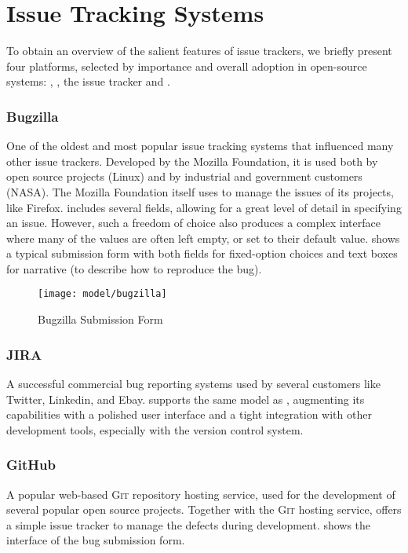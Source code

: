 
\section{Issue Tracking Systems}\label{sec:bugtrackers}

To obtain an overview of the salient features of issue trackers, we briefly present four platforms, selected by importance and overall adoption in open-source systems: \bzilla, \jira, the \gth issue tracker and \fbz.

\subsubsection{Bugzilla} One of the oldest and most popular issue tracking systems that influenced many other issue trackers. Developed by the Mozilla Foundation, it is used both by open source projects (\eg Linux) and by industrial and government customers (\eg NASA). The Mozilla Foundation itself uses \bzilla to manage the issues of its projects, like Firefox. \bzilla includes several fields, allowing for a great level of detail in specifying an issue. However, such a freedom of choice also produces a complex interface where many of the values are often left empty, or set to their default value.  shows a typical submission form with both fields for fixed-option choices and text boxes for narrative (\eg to describe how to reproduce the bug).

\begin{figure}[ht]
\centering
  \texttt{[image: model/bugzilla]}
  \caption{Bugzilla Submission Form}
  \label{fig:bugzilla-interface}
\end{figure}

\subsubsection{JIRA} A successful commercial bug reporting systems used by several customers like Twitter, Linkedin, and Ebay. \jira supports the same model as \bzilla, augmenting its capabilities with a polished user interface and a tight integration with other development tools, especially with the version control system.


\subsubsection{GitHub} A popular web-based \textsc{Git} repository hosting service, used for the development of several popular open source projects. Together with the \textsc{Git} hosting service, \gth offers a simple issue tracker to manage the defects during development.  shows the interface of the \gth bug submission form.

